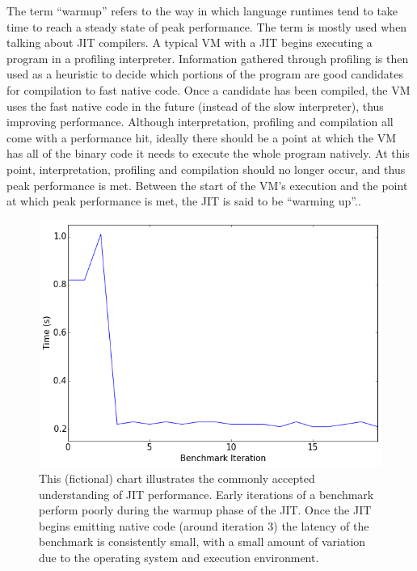 \documentclass[10pt,preprint]{sigplanconf}
\begin{document}
The term ``warmup'' refers to the way in which language runtimes tend to take
time to reach a steady state of peak performance. The term is mostly used when
talking about JIT compilers. A typical VM
with a JIT begins executing a program in a profiling interpreter. Information
gathered through profiling is then used as a heuristic to decide which portions
of the program are good candidates for compilation to fast native code. Once a
candidate has been compiled, the VM uses the fast native code in the future
(instead of the slow interpreter), thus improving performance.  Although
interpretation, profiling and compilation all come with a performance hit,
ideally there should be a point at which the VM has all of the binary code it
needs to execute the whole program natively. At this point, interpretation,
profiling and compilation should no longer occur, and thus peak performance is
met. Between the start of the VM's execution and the point at which peak
performance is met, the JIT is said to be ``warming up''..

\begin{figure}[h!]
\centering
\includegraphics[width=.4\textwidth]{img/trad}
\caption{This (fictional) chart illustrates the commonly accepted understanding
of JIT performance. Early iterations of a benchmark perform poorly during the
warmup phase of the JIT. Once the JIT begins emitting native code (around
iteration 3) the latency of the benchmark is consistently small, with a small
amount of variation due to the operating system and execution environment.}
\label{fig:trad}
\end{figure}
\end{document}
